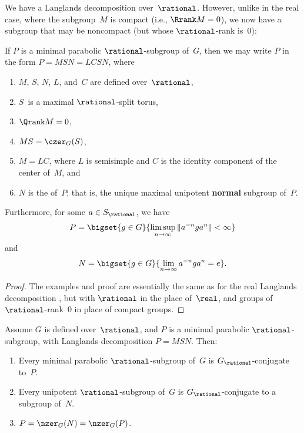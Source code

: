 We have a Langlands decomposition over~$\rational$. However, unlike in the real case, where the subgroup~$M$ is compact (i.e., $\Rrank M = 0$), we now have a subgroup that may be noncompact (but whose $\rational$-rank is~$0$):

\begin{thm}
\label{LanglandsDecompQ}
 If $P$ is a minimal parabolic\/ $\rational$-subgroup of~$G$, then we may write $P$ in the form $P = MSN = LCSN$, where%
	 \begin{enumerate}
	 \item $M$, $S$, $N$, $L$, and~$C$ are defined over~$\rational$,
	 \item $S$~is a maximal $\rational$-split torus, 
	 \item \label{LanglandsDecompQ-M=0}
	 $\Qrank M = 0$,
	 \item $M S = \czer_G(S)$,
	 \item $M = LC$, where $L$ is semisimple and $C$ is the identity component of the center of~$M$,
	and 
	 \item $N$ is the {\upshape{}} of~$P$; that is, the unique maximal unipotent \textbf{normal} subgroup of~$P$. 
	 \end{enumerate}
Furthermore, 
for some $a \in S_{\rational}$, we have
	 \begin{align} \label{aContractsP}
	  P = \bigset{ g \in G }{ \limsup_{n \to \infty} \| a^{-n}
	g a^n \| < \infty } 
	\end{align}
and
	 \begin{align}
	N = \bigset{ g \in G }{ \lim_{n \to \infty} a^{-n} g a^n = e } 
	. \end{align}
 \end{thm}

\begin{proof}
The examples and proof are essentially the same as for the real Langlands decomposition , but with $\rational$ in the place of~$\real$, and groups of $\rational$-rank~$0$ in place of compact groups.
\end{proof}

\begin{prop} \label{parab/Q}
 Assume $G$ is defined over~$\rational$, and $P$ is a minimal parabolic $\rational$-subgroup, with Langlands decomposition $P = MSN$. Then:
	 \begin{enumerate}
	 \item \label{parab/Q-conj}
	 Every minimal parabolic $\rational$-subgroup of~$G$ is $G_\rational$-conjugate to~$P$.
	 \item \label{parab/Q-U}
	Every unipotent $\rational$-subgroup of~$G$ is $G_\rational$-conjugate to a subgroup of~$N$.
	\item \label{parab/Q-nzer}
	$P = \nzer_G(N) = \nzer_G(P)$.
	 \end{enumerate}
 \end{prop}

